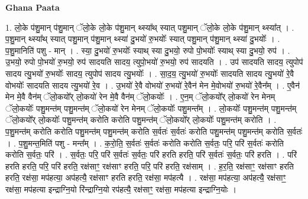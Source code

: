 \documentclass[17pt]{extarticle}
\begin{document}
\textbf{Ghana Paata } \newline

1. लो॒के प॑शु॒मान् प॑शु॒मान् ॅलो॒के लो॒के प॑शु॒मान् थ्स्या᳚थ् स्यात् पशु॒मान् ॅलो॒के लो॒के प॑शु॒मान् थ्स्या᳚त् । . प॒शु॒मान् थ्स्या᳚थ् स्यात् पशु॒मान् प॑शु॒मान् थ्स्या॑ दु॒भयो॑ रु॒भयोः᳚ स्यात् पशु॒मान् प॑शु॒मान् थ्स्या॑ दु॒भयोः᳚ । . प॒शु॒मानिति॑ पशु - मान् । . स्या॒ दु॒भयो॑ रु॒भयोः᳚ स्याथ् स्या दु॒भयो॒ रुपो पो॒भयोः᳚ स्याथ् स्या दु॒भयो॒ रुप॑ । . उ॒भयो॒ रुपो पो॒भयो॑ रु॒भयो॒ रुप॑ सादयति सादय॒ त्युपो॒भयो॑ रु॒भयो॒ रुप॑ सादयति । . उप॑ सादयति सादय॒ त्युपोप॑ सादय त्यु॒भयो॑ रु॒भयोः᳚ सादय॒ त्युपोप॑ सादय त्यु॒भयोः᳚ । . सा॒द॒य॒ त्यु॒भयो॑ रु॒भयोः᳚ सादयति सादय त्यु॒भयो॑ रे॒वै वोभयोः᳚ सादयति सादय त्यु॒भयो॑ रे॒व । . उ॒भयो॑ रे॒वै वोभयो॑ रु॒भयो॑ रे॒वैन॑ मेन मे॒वोभयो॑ रु॒भयो॑ रे॒वैन᳚म् । . ए॒वैन॑ मेन मे॒वै वैन॑म् ॅलो॒कयो᳚र् लो॒कयो॑ रेन मे॒वै वैन॑म् ॅलो॒कयोः᳚ । . ए॒न॒म् ॅलो॒कयो᳚र् लो॒कयो॑ रेन मेनम् ॅलो॒कयोः᳚ पशु॒मन्त॑म् पशु॒मन्त॑म् ॅलो॒कयो॑ रेन मेनम् ॅलो॒कयोः᳚ पशु॒मन्त᳚म् । . लो॒कयोः᳚ पशु॒मन्त॑म् पशु॒मन्त॑म् ॅलो॒कयो᳚र् लो॒कयोः᳚ पशु॒मन्त॑म् करोति करोति पशु॒मन्त॑म् ॅलो॒कयो᳚र् लो॒कयोः᳚ पशु॒मन्त॑म् करोति । . प॒शु॒मन्त॑म् करोति करोति पशु॒मन्त॑म् पशु॒मन्त॑म् करोति स॒र्वतः॑ स॒र्वतः॑ करोति पशु॒मन्त॑म् पशु॒मन्त॑म् करोति स॒र्वतः॑ । . प॒शु॒मन्त॒मिति॑ पशु - मन्त᳚म् । . क॒रो॒ति॒ स॒र्वतः॑ स॒र्वतः॑ करोति करोति स॒र्वतः॒ परि॒ परि॑ स॒र्वतः॑ करोति करोति स॒र्वतः॒ परि॑ । . स॒र्वतः॒ परि॒ परि॑ स॒र्वतः॑ स॒र्वतः॒ परि॑ हरति हरति॒ परि॑ स॒र्वतः॑ स॒र्वतः॒ परि॑ हरति । . परि॑ हरति हरति॒ परि॒ परि॑ हरति॒ रक्ष॑साꣳ॒॒ रक्ष॑साꣳ हरति॒ परि॒ परि॑ हरति॒ रक्ष॑साम् । . ह॒र॒ति॒ रक्ष॑साꣳ॒॒ रक्ष॑साꣳ हरति हरति॒ रक्ष॑सा॒ मप॑हत्या॒ अप॑हत्यै॒ रक्ष॑साꣳ हरति हरति॒ रक्ष॑सा॒ मप॑हत्यै । . रक्ष॑सा॒ मप॑हत्या॒ अप॑हत्यै॒ रक्ष॑साꣳ॒॒ रक्ष॑सा॒ मप॑हत्या इन्द्राग्नि॒यो रि॑न्द्राग्नि॒यो रप॑हत्यै॒ रक्ष॑साꣳ॒॒ रक्ष॑सा॒ मप॑हत्या इन्द्राग्नि॒योः । \newline
\end{document}

